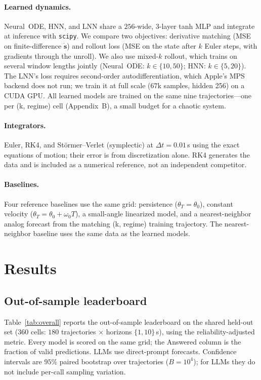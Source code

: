 \documentclass{article}
\begin{document}
\paragraph{Learned dynamics.} Neural~ODE, HNN, and LNN share a $256$-wide, $3$-layer tanh
MLP and integrate at inference with \texttt{scipy}. We compare two objectives: derivative
matching (MSE on finite-difference $\dot{\mathbf{s}}$) and rollout loss (MSE on the state
after $k$ Euler steps, with gradients through the unroll). We also use mixed-$k$ rollout,
which trains on several window lengths jointly (Neural~ODE: $k\in\{10,50\}$; HNN:
$k\in\{5,20\}$). The LNN's loss requires second-order autodifferentiation, which Apple's MPS
backend does not run; we train it at full scale ($67$k samples, hidden 256) on a CUDA GPU.
All learned models are trained on the same nine trajectories---one per (k, regime) cell
(Appendix~B), a small budget for a chaotic system.

\paragraph{Integrators.} Euler, RK4, and St\"ormer--Verlet (symplectic) at $\Delta
t{=}0.01$\,s using the exact equations of motion; their error is from discretization alone.
RK4 generates the data and is included as a numerical reference, not an independent
competitor.

\paragraph{Baselines.} Four reference baselines use the same grid: persistence
($\theta_T{=}\theta_0$), constant velocity ($\theta_T{=}\theta_0{+}\omega_0T$), a
small-angle linearized model, and a nearest-neighbor analog forecast from the matching
(k, regime) training trajectory. The nearest-neighbor baseline uses the same data as the
learned models.

\section{Results}
\subsection{Out-of-sample leaderboard}
\label{sec:reliability}
Table~\ref{tab:overall} reports the out-of-sample leaderboard on the shared held-out set
($360$ cells: $180$ trajectories $\times$ horizons $\{1,10\}$\,s), using the
reliability-adjusted metric. Every model is scored on the same grid; the Answered column is
the fraction of valid predictions. LLMs use direct-prompt forecasts. Confidence intervals are
$95\%$ paired bootstrap over trajectories ($B{=}10^4$); for LLMs they do not include
per-call sampling variation.
\end{document}
